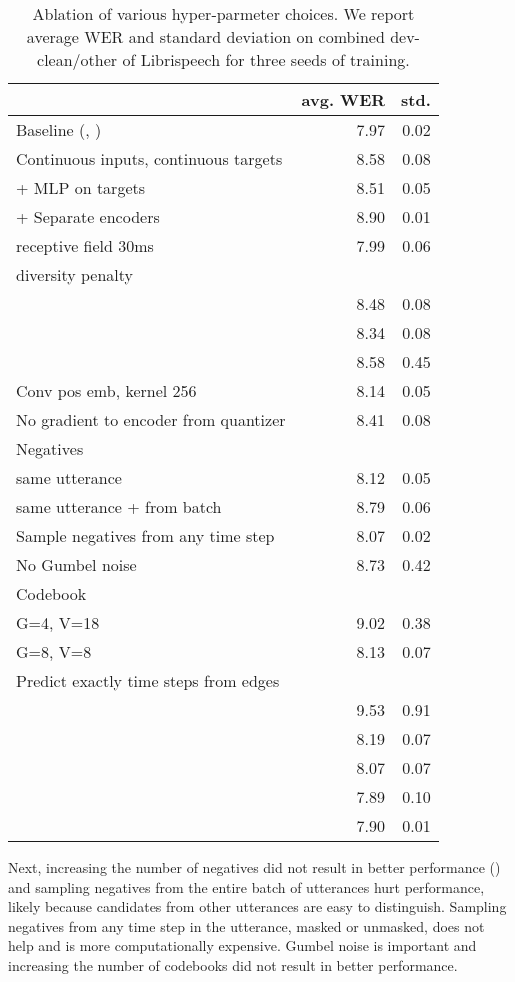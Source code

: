 \documentclass{article}
\newcommand{\libri}{Librispeech}
\begin{document}
\begin{table}[h!]
\caption{Ablation of various hyper-parmeter choices. We report average WER and standard deviation on combined dev-clean/other of \libri{} for three seeds of training.
}
\label{tbl:ablations}
\centering
\begin{tabular}{lrr}
\toprule
{} & avg. WER &  std. \\
\midrule
Baseline (, ) & 7.97 & 0.02 \\
\midrule
Continuous inputs, continuous targets & 8.58 & 0.08 \\
+ MLP on targets & 8.51 & 0.05 \\
+ Separate encoders & 8.90 & 0.01 \\
\midrule
receptive field 30ms & 7.99 & 0.06 \\
\midrule
diversity penalty \\
 & 8.48 & 0.08 \\
 & 8.34 & 0.08 \\
 & 8.58 & 0.45 \\
\midrule
\midrule
Conv pos emb, kernel 256 & 8.14 & 0.05 \\
\midrule
No gradient to encoder from quantizer & 8.41 & 0.08 \\
\midrule
Negatives \\
 same utterance & 8.12 & 0.05 \\
 same utterance +  from batch & 8.79 & 0.06 \\
\midrule
Sample negatives from any time step & 8.07 & 0.02 \\
\midrule
No Gumbel noise & 8.73 & 0.42 \\
\midrule
Codebook \\
G=4, V=18 & 9.02 & 0.38 \\
G=8, V=8 & 8.13 & 0.07 \\
\midrule
Predict exactly  time steps from edges \\
 & 9.53 & 0.91 \\
 & 8.19 & 0.07 \\
 & 8.07 & 0.07 \\
 & 7.89 & 0.10 \\
 & 7.90 & 0.01 \\
\bottomrule
\end{tabular}
\end{table}


Next, increasing the number of negatives did not result in better performance () and sampling negatives from the entire batch of utterances hurt performance, likely because candidates from other utterances are easy to distinguish.
Sampling negatives from any time step in the utterance, masked or unmasked, does not help and is more computationally expensive.
Gumbel noise is important and increasing the number of codebooks did not result in better performance.
\end{document}
